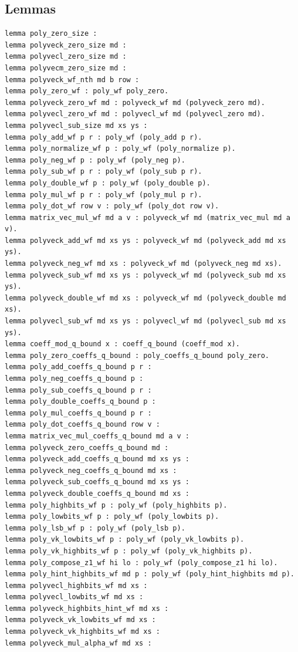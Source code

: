 \subsection*{Lemmas}
\begin{lstlisting}[language=EasyCrypt,basicstyle=\ttfamily\tiny]
lemma poly_zero_size :
lemma polyveck_zero_size md :
lemma polyvecl_zero_size md :
lemma polyvecm_zero_size md :
lemma polyveck_wf_nth md b row :
lemma poly_zero_wf : poly_wf poly_zero.
lemma polyveck_zero_wf md : polyveck_wf md (polyveck_zero md).
lemma polyvecl_zero_wf md : polyvecl_wf md (polyvecl_zero md).
lemma polyvecl_sub_size md xs ys :
lemma poly_add_wf p r : poly_wf (poly_add p r).
lemma poly_normalize_wf p : poly_wf (poly_normalize p).
lemma poly_neg_wf p : poly_wf (poly_neg p).
lemma poly_sub_wf p r : poly_wf (poly_sub p r).
lemma poly_double_wf p : poly_wf (poly_double p).
lemma poly_mul_wf p r : poly_wf (poly_mul p r).
lemma poly_dot_wf row v : poly_wf (poly_dot row v).
lemma matrix_vec_mul_wf md a v : polyveck_wf md (matrix_vec_mul md a v).
lemma polyveck_add_wf md xs ys : polyveck_wf md (polyveck_add md xs ys).
lemma polyveck_neg_wf md xs : polyveck_wf md (polyveck_neg md xs).
lemma polyveck_sub_wf md xs ys : polyveck_wf md (polyveck_sub md xs ys).
lemma polyveck_double_wf md xs : polyveck_wf md (polyveck_double md xs).
lemma polyvecl_sub_wf md xs ys : polyvecl_wf md (polyvecl_sub md xs ys).
lemma coeff_mod_q_bound x : coeff_q_bound (coeff_mod x).
lemma poly_zero_coeffs_q_bound : poly_coeffs_q_bound poly_zero.
lemma poly_add_coeffs_q_bound p r :
lemma poly_neg_coeffs_q_bound p :
lemma poly_sub_coeffs_q_bound p r :
lemma poly_double_coeffs_q_bound p :
lemma poly_mul_coeffs_q_bound p r :
lemma poly_dot_coeffs_q_bound row v :
lemma matrix_vec_mul_coeffs_q_bound md a v :
lemma polyveck_zero_coeffs_q_bound md :
lemma polyveck_add_coeffs_q_bound md xs ys :
lemma polyveck_neg_coeffs_q_bound md xs :
lemma polyveck_sub_coeffs_q_bound md xs ys :
lemma polyveck_double_coeffs_q_bound md xs :
lemma poly_highbits_wf p : poly_wf (poly_highbits p).
lemma poly_lowbits_wf p : poly_wf (poly_lowbits p).
lemma poly_lsb_wf p : poly_wf (poly_lsb p).
lemma poly_vk_lowbits_wf p : poly_wf (poly_vk_lowbits p).
lemma poly_vk_highbits_wf p : poly_wf (poly_vk_highbits p).
lemma poly_compose_z1_wf hi lo : poly_wf (poly_compose_z1 hi lo).
lemma poly_hint_highbits_wf md p : poly_wf (poly_hint_highbits md p).
lemma polyvecl_highbits_wf md xs :
lemma polyvecl_lowbits_wf md xs :
lemma polyveck_highbits_hint_wf md xs :
lemma polyveck_vk_lowbits_wf md xs :
lemma polyveck_vk_highbits_wf md xs :
lemma polyveck_mul_alpha_wf md xs :

\end{lstlisting}
